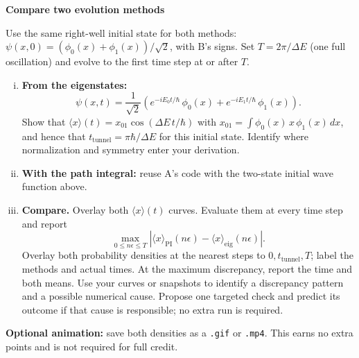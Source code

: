 \begin{problem}[10]
  \textbf{Compare two evolution methods}

  Use the same right-well initial state for both methods:
  $\psi(x,0)=(\phi_0(x)+\phi_1(x))/\sqrt{2}$, with B's signs.
  Set $T=2\pi/\Delta E$ (one full oscillation) and evolve to the first time step at or after $T$.
  \begin{enumerate}[(i)]
    \item \textbf{From the eigenstates:}
          \begin{equation}
            \psi(x, t) = \frac{1}{\sqrt{2}}\left(e^{-iE_0t/\hbar}\, \phi_0(x) + e^{-iE_1t/\hbar}\, \phi_1(x)\right).
          \end{equation}
          Show that $\langle x \rangle(t) = x_{01}\cos(\Delta E\, t/\hbar)$ with $x_{01} = \int \phi_0(x)\, x\, \phi_1(x)\, dx$, and hence that $t_\mathrm{tunnel} = \pi\hbar/\Delta E$ for this initial state.
          Identify where normalization and symmetry enter your derivation.
    \item \textbf{With the path integral:} reuse A's code with the two-state initial wave function above.
    \item \textbf{Compare.} Overlay both $\langle x\rangle(t)$ curves. Evaluate them at every time step and report
          \begin{equation}
            \max_{0\leq n\epsilon\leq T}
              \left|\langle x\rangle_\mathrm{PI}(n\epsilon)-\langle x\rangle_\mathrm{eig}(n\epsilon)\right|.
          \end{equation}
          Overlay both probability densities at the nearest steps to $0,t_\mathrm{tunnel},T$; label the methods and actual times.
          At the maximum discrepancy, report the time and both means.
          Use your curves or snapshots to identify a discrepancy pattern and a possible numerical cause.
          Propose one targeted check and predict its outcome if that cause is responsible; no extra run is required.
  \end{enumerate}

  \textbf{Optional animation:} save both densities as a \texttt{.gif} or \texttt{.mp4}.
  This earns no extra points and is not required for full credit.
\end{problem}

\begin{solution}
\end{solution}

